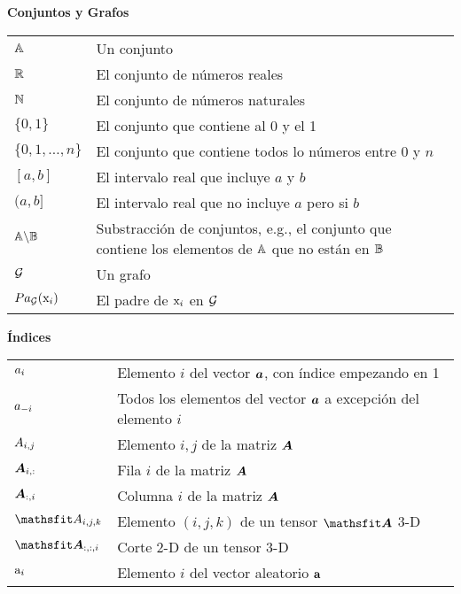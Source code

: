 \vspace{\notationgap}
\begin{minipage}{\textwidth}
\centerline{\bf Conjuntos y Grafos}
\bgroup
\def\arraystretch{1.5}
\begin{tabular}{>{\centering}m{} p{}}
$\displaystyle {\mathbb{A}}$ & Un conjunto\\
$\displaystyle \mathbb{R}$ & El conjunto de números reales \\
$\displaystyle \mathbb{N}$ & El conjunto de números naturales \\
$\displaystyle \{0, 1\}$ & El conjunto que contiene al 0 y el 1 \\
$\displaystyle \{0, 1, \dots, n \}$ & El conjunto que contiene todos lo números entre $0$ y $n$\\
$\displaystyle [a, b]$ & El intervalo real que incluye $a$ y $b$\\
$\displaystyle (a, b]$ & El intervalo real que no incluye $a$ pero si $b$ \\
$\displaystyle {\mathbb{A}} \backslash {\mathbb{B}}$ & Substracción de conjuntos, e.g., el conjunto que contiene los elementos de  ${\mathbb{A}}$ que no están en ${\mathbb{B}}$\\
$\displaystyle {\mathcal{G}}$ & Un grafo\\
$\displaystyle Pa_{\mathcal{G}}({\textnormal{x}}_i)$ & El padre de ${\textnormal{x}}_i$ en ${\mathcal{G}}$
\end{tabular}
\egroup
{}
\end{minipage}

\vspace{\notationgap}
\begin{minipage}{\textwidth}
\centerline{\bf Índices}
\bgroup
\def\arraystretch{1.5}
\begin{tabular}{>{\centering}m{} p{}}
$\displaystyle {a}_i$ & Elemento $i$ del vector ${\bm{a}}$, con índice empezando en 1\\
$\displaystyle {a}_{-i}$ & Todos los elementos del vector ${\bm{a}}$ a excepción del elemento $i$ \\
$\displaystyle {A}_{i,j}$ & Elemento $i, j$ de la matriz ${\bm{A}}$ \\
$\displaystyle {\bm{A}}_{i, :}$ & Fila $i$ de la matriz ${\bm{A}}$ \\
$\displaystyle {\bm{A}}_{:, i}$ & Columna $i$ de la matriz ${\bm{A}}$ \\
$\displaystyle \etA_{i, j, k}$ & Elemento $(i, j, k)$ de un tensor $\tA$ 3-D\\
$\displaystyle \tA_{:, :, i}$ & Corte 2-D de un tensor 3-D\\
$\displaystyle {\textnormal{a}}_i$ & Elemento $i$ del vector aleatorio ${\mathbf{a}}$ \\
\end{tabular}
\egroup
\end{minipage}

